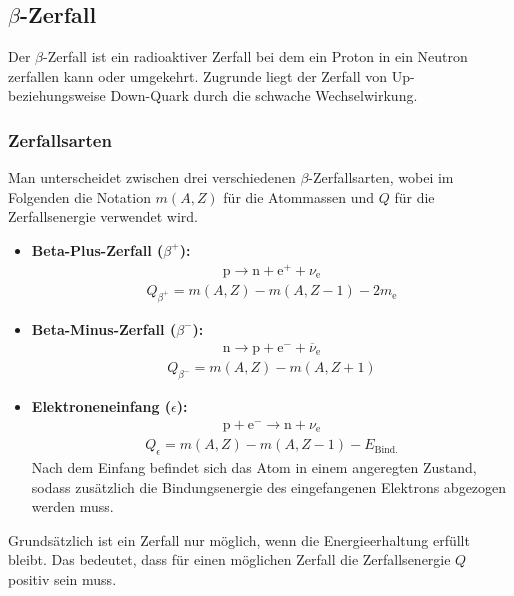 \documentclass[11pt, a4paper]{article}
\numberwithin{equation}{section}
\begin{document}
\subsection{$\beta$-Zerfall}
Der $\beta$-Zerfall ist ein radioaktiver Zerfall bei dem ein Proton in ein Neutron zerfallen kann oder umgekehrt.
Zugrunde liegt der Zerfall von Up- beziehungsweise Down-Quark durch die schwache Wechselwirkung.

\subsubsection{Zerfallsarten}
Man unterscheidet zwischen drei verschiedenen $\beta$-Zerfallsarten, wobei im Folgenden die Notation $m(A,Z)$ für die Atommassen und $Q$ für die Zerfallsenergie verwendet wird.
\begin{itemize}
	\item \textbf{Beta-Plus-Zerfall ($\beta^+$):}
	\begin{align*}
	\mathrm{p} \to \mathrm{n} + \mathrm{e}^+ + \nu_\mathrm{e}
	\end{align*}
	\begin{align}
		Q_{\beta^+} = m( A, Z ) - m( A, Z - 1) - 2 m_\mathrm{e}
	\end{align}
	
	\item \textbf{Beta-Minus-Zerfall ($\beta^-$):}
	\begin{align*}
	\mathrm{n} \to \mathrm{p} + \mathrm{e}^- + \overline{\nu}_\mathrm{e}
	\end{align*}
	\begin{align}
	Q_{\beta^-} = m( A, Z ) - m( A, Z + 1)
	\end{align}
	
	\item \textbf{Elektroneneinfang ($\epsilon$):}
	\begin{align*}
	\mathrm{p} + \mathrm{e}^- \to \mathrm{n} + \nu_\mathrm{e}
	\end{align*}
	\begin{align}
	Q_{\epsilon} = m( A, Z ) - m( A, Z - 1) - E_\mathrm{Bind.}
	\end{align}
	Nach dem Einfang befindet sich das Atom in einem angeregten Zustand, sodass zusätzlich die Bindungsenergie des eingefangenen Elektrons abgezogen werden muss.
\end{itemize}
Grundsätzlich ist ein Zerfall nur möglich, wenn die Energieerhaltung erfüllt bleibt.
Das bedeutet, dass für einen möglichen Zerfall die Zerfallsenergie $Q$ positiv sein muss.
\end{document}
